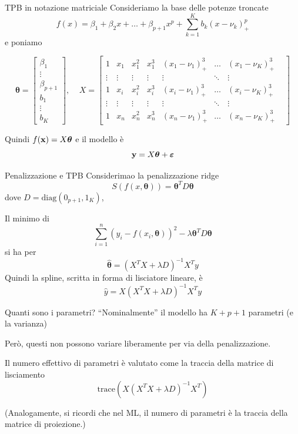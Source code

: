 \documentclass{beamer}\usepackage[]{graphicx}\usepackage[]{color}
\newcommand{\spazio}{\noindent\makebox[\linewidth]{\resizebox{0.1\linewidth}{1pt}{{$\bullet$}}}}
\begin{document}
\begin{frame}[fragile]{TPB in notazione matriciale}
Consideriamo la base delle potenze troncate
\[ f(x) = \beta_1+\beta_2 x + \ldots + \beta_{p+1}x^p + \sum_{k=1}^K b_k (x-\nu_k)_+^p \]
e poniamo 
\begin{scriptsize}
\[
{\bm\theta}=\begin{bmatrix} \beta_1 \\ \vdots \\ \beta_{p+1} \\ b_1 \\ \vdots \\ b_K \end{bmatrix},\;\;\;\;
X=\begin{bmatrix}
1 & x_1 & x_1^2 & x_1^3 & (x_1-\nu_1)_+^3 & \ldots & (x_1-\nu_K)_+^3 \\
\vdots & \vdots & \vdots & \vdots & \vdots & \ddots & \vdots & \\
1 & x_i & x_i^2 & x_i^3 & (x_i-\nu_1)_+^3 & \ldots & (x_i-\nu_K)_+^3 \\
\vdots & \vdots & \vdots & \vdots & \vdots & \ddots & \vdots & \\
1 & x_n & x_n^2 & x_n^3 & (x_n-\nu_1)_+^3 & \ldots & (x_n-\nu_K)_+^3 
\end{bmatrix}
\]
\end{scriptsize}
Quindi $f({\bf x})=X{\bm\theta}$ e il modello \`e
\[ {\bf y} = X{\bm\theta} + {\bm\varepsilon}  \]
\end{frame}

\begin{frame}[fragile]{Penalizzazione e TPB}
Considerimao la penalizzazione ridge
\[ S(f(x,{\bm\theta})) = {\bm\theta}^TD{\bm\theta} \]
dove $D=\text{diag}(0_{p+1},1_K)$,

\spazio

Il minimo di
\[ \sum_{i=1}^n(y_i-f(x_i,{\bm\theta}))^2 - \lambda{\bm\theta}^TD{\bm\theta}  \]
si ha per
\[ {\bm\hat\theta} = (X^TX+\lambda D)^{-1}X^Ty \]
Quindi la spline, scritta in forma di lisciatore lineare, \`e
\[ \hat{y} = X(X^TX+\lambda D)^{-1}X^Ty \]
\end{frame}

\begin{frame}{Quanti sono i parametri?}
``Nominalmente'' il modello ha $K+p+1$ parametri (e la varianza)

\spazio

Per\`o, questi non possono variare liberamente per via della penalizzazione.

\spazio

Il numero effettivo di parametri \`e valutato come la traccia della matrice di lisciamento
\[ \mbox{trace}(X(X^TX+\lambda D)^{-1}X^T) \]

\spazio

(Analogamente, si ricordi che nel ML, il numero di parametri \`e la traccia della matrice di proiezione.)

\end{frame}
\end{document}
